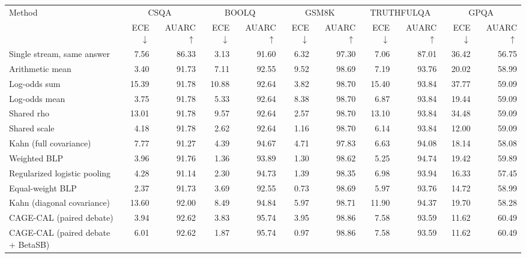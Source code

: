 \begin{tabular}{lrrrrrrrrrr}
\toprule
Method & \multicolumn{2}{c}{CSQA} & \multicolumn{2}{c}{BOOLQ} & \multicolumn{2}{c}{GSM8K} & \multicolumn{2}{c}{TRUTHFULQA} & \multicolumn{2}{c}{GPQA} \\
 & ECE $\downarrow$ & AUARC $\uparrow$ & ECE $\downarrow$ & AUARC $\uparrow$ & ECE $\downarrow$ & AUARC $\uparrow$ & ECE $\downarrow$ & AUARC $\uparrow$ & ECE $\downarrow$ & AUARC $\uparrow$ \\
\midrule
Single stream, same answer & 7.56 & 86.33 & 3.13 & 91.60 & 6.32 & 97.30 & 7.06 & 87.01 & 36.42 & 56.75 \\
Arithmetic mean & 3.40 & 91.73 & 7.11 & 92.55 & 9.52 & 98.69 & 7.19 & 93.76 & 20.02 & 58.99 \\
Log-odds sum & 15.39 & 91.78 & 10.88 & 92.64 & 3.82 & 98.70 & 15.40 & 93.84 & 37.77 & 59.09 \\
Log-odds mean & 3.75 & 91.78 & 5.33 & 92.64 & 8.38 & 98.70 & 6.87 & 93.84 & 19.44 & 59.09 \\
Shared rho & 13.01 & 91.78 & 9.57 & 92.64 & 2.57 & 98.70 & 13.10 & 93.84 & 34.48 & 59.09 \\
Shared scale & 4.18 & 91.78 & 2.62 & 92.64 & 1.16 & 98.70 & 6.14 & 93.84 & 12.00 & 59.09 \\
Kahn (full covariance) & 7.77 & 91.27 & 4.39 & 94.67 & 4.71 & 97.83 & 6.63 & 94.08 & 18.14 & 58.08 \\
Weighted BLP & 3.96 & 91.76 & 1.36 & 93.89 & 1.30 & 98.62 & 5.25 & 94.74 & 19.42 & 59.89 \\
Regularized logistic pooling & 4.28 & 91.14 & 2.30 & 94.73 & 1.39 & 98.35 & 6.98 & 93.94 & 16.33 & 57.45 \\
Equal-weight BLP & 2.37 & 91.73 & 3.69 & 92.55 & 0.73 & 98.69 & 5.97 & 93.76 & 14.72 & 58.99 \\
Kahn (diagonal covariance) & 13.60 & 92.00 & 8.49 & 94.84 & 5.97 & 98.71 & 11.90 & 94.37 & 19.70 & 58.28 \\
CAGE-CAL (paired debate) & 3.94 & 92.62 & 3.83 & 95.74 & 3.95 & 98.86 & 7.58 & 93.59 & 11.62 & 60.49 \\
CAGE-CAL (paired debate + BetaSB) & 6.01 & 92.62 & 1.87 & 95.74 & 0.97 & 98.86 & 7.58 & 93.59 & 11.62 & 60.49 \\
\bottomrule
\end{tabular}
